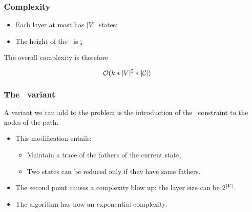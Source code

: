 \begin{frame}
  \frametitle{Complexity}

  \begin{itemize}
    \item Each layer at most has $| V |$ states;
    \item The height of the \mdd\ is \k;
  \end{itemize}

  The overall complexity is therefore
  \begin{center}
    \alert{$$\mathcal{O}(k * | V | ^ 2 * | \mathcal{C} |)$$}
  \end{center}
  
\end{frame}

\begin{frame}
  \frametitle{The \alldiff\ variant}

  A variant we can add to the problem is the introduction of the \alldiff\ constraint to the nodes of the path.

  \begin{itemize}
    \item This modification entails:
          \begin{itemize}
            \item Maintain a trace of the fathers of the current state,
            \item Two states can be reduced only if they have same fathers.
          \end{itemize}
    \item The second point causes a complexity blow up: the layer size can be $2^{|V|}$.
    \item The algorithm has now an exponential complexity.
  \end{itemize}

\end{frame}

